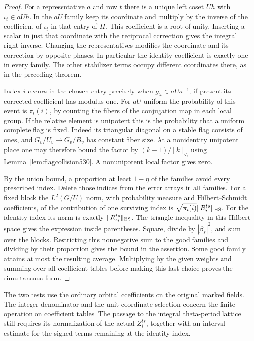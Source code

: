 \documentclass[a4paper,11pt]{article}
\theoremstyle{definition}
\theoremstyle{remark}
\numberwithin{equation}{section}
\begin{document}
\begin{proof}
For a representative \(a\) and row \(t\) there is a unique
left coset \(Uh\) with \(\iota_t\in aUh\). In the \(aU\)
family keep its coordinate and multiply by the inverse of the
coefficient of \(\iota_t\) in that entry of \(H\). This
coefficient is a root of unity. Inserting a scalar in just
that coordinate with the reciprocal correction gives the
integral right inverse. Changing the representatives modifies
the coordinate and its correction by opposite phases. In
particular the identity coefficient is exactly one in every
family. The other stabilizer terms occupy different coordinates
there, as in the preceding theorem.

Index \(i\) occurs in the chosen entry precisely when
\(g_{ti}\in aUa^{-1}\); if present its corrected coefficient
has modulus one. For \(aU\) uniform the probability of this
event is \(\pi_t(i)\), by counting the fibers of the conjugation
map in each local group. If the relative element is unipotent
this is the probability that a uniform complete flag is fixed.
Indeed its triangular diagonal on a stable flag consists of
ones, and \(G_v/U_v\to G_v/B_v\) has constant fiber size.
At a nonidentity unipotent place one may therefore bound the
factor by \((k-1)/[k]_{q_v}\) using
Lemma~\ref{lem:flagcollision530}. A nonunipotent local factor
gives zero.

By the union bound, a proportion at least \(1-\eta\) of the
families avoid every prescribed index. Delete those indices
from the error arrays in all families. For a fixed block the
\(L^2(G/U)\) norm, with probability measure and Hilbert--Schmidt
coefficients, of the contribution of one surviving index is
\(\sqrt{\pi_t(i)}\|R_i^{ts}\|_{\rm HS}\). For the identity index
its norm is exactly \(\|R_{\iota_t}^{ts}\|_{\rm HS}\). The
triangle inequality in this Hilbert space gives the expression
inside parentheses. Square, divide by \(|\beta_s|^2\), and sum
over the blocks. Restricting this nonnegative sum to the good
families and dividing by their proportion gives the bound in
the assertion. Some good family attains at most the resulting
average. Multiplying by the given weights and summing over
all coefficient tables before making this last choice proves
the simultaneous form.
\end{proof}

The two tests use the ordinary orbital coefficients on the
original marked fields. The integer denominator and the unit
coordinate selection concern the finite operation on coefficient
tables. The passage to the integral theta-period lattice still
requires its normalization of the actual \(Z_i^{ts}\), together
with an interval estimate for the signed terms remaining at the
identity index.
\end{document}
